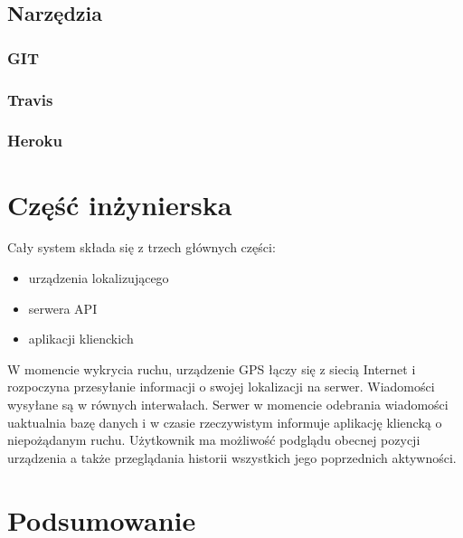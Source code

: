 \documentclass[eng,printmode]{mgr}
\begin{document}
\section{Narzędzia}
\subsection{GIT}
\subsection{Travis}
\subsection{Heroku}

\chapter{Część inżynierska}
Cały system składa się z trzech głównych części:
\begin{itemize}
\item urządzenia lokalizującego
\item serwera API
\item aplikacji klienckich
\end{itemize}

W momencie wykrycia ruchu, urządzenie GPS łączy się z siecią Internet i rozpoczyna przesyłanie informacji o swojej lokalizacji na serwer. Wiadomości wysyłane są w równych interwałach. Serwer w momencie odebrania wiadomości uaktualnia bazę danych i w czasie rzeczywistym informuje aplikację kliencką o niepożądanym ruchu. Użytkownik ma możliwość podglądu obecnej pozycji urządzenia a także przeglądania historii wszystkich jego poprzednich aktywności.

\chapter{Podsumowanie}

 
\end{document}
